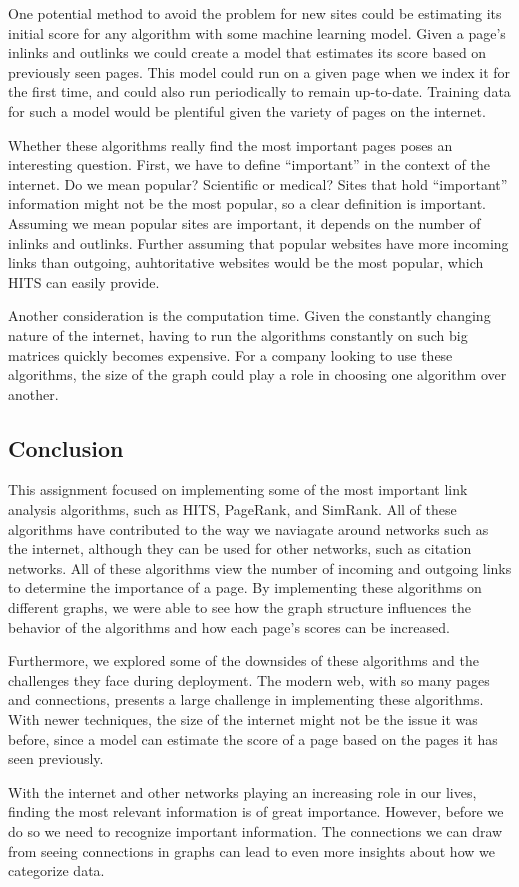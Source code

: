 \documentclass[
  paper=a4,
,captions=tableheading
]{scrartcl}
\begin{document}
One potential method to avoid the problem for new sites could be
estimating its initial score for any algorithm with some machine
learning model. Given a page's inlinks and outlinks we could create a
model that estimates its score based on previously seen pages. This
model could run on a given page when we index it for the first time, and
could also run periodically to remain up-to-date. Training data for such
a model would be plentiful given the variety of pages on the internet.

Whether these algorithms really find the most important pages poses an
interesting question. First, we have to define ``important'' in the
context of the internet. Do we mean popular? Scientific or medical?
Sites that hold ``important'' information might not be the most popular,
so a clear definition is important. Assuming we mean popular sites are
important, it depends on the number of inlinks and outlinks. Further
assuming that popular websites have more incoming links than outgoing,
auhtoritative websites would be the most popular, which HITS can easily
provide.

Another consideration is the computation time. Given the constantly
changing nature of the internet, having to run the algorithms constantly
on such big matrices quickly becomes expensive. For a company looking to
use these algorithms, the size of the graph could play a role in
choosing one algorithm over another.

\hypertarget{conclusion}{%
\subsection{Conclusion}\label{conclusion}}

This assignment focused on implementing some of the most important link
analysis algorithms, such as HITS, PageRank, and SimRank. All of these
algorithms have contributed to the way we naviagate around networks such
as the internet, although they can be used for other networks, such as
citation networks. All of these algorithms view the number of incoming
and outgoing links to determine the importance of a page. By
implementing these algorithms on different graphs, we were able to see
how the graph structure influences the behavior of the algorithms and
how each page's scores can be increased.

Furthermore, we explored some of the downsides of these algorithms and
the challenges they face during deployment. The modern web, with so many
pages and connections, presents a large challenge in implementing these
algorithms. With newer techniques, the size of the internet might not be
the issue it was before, since a model can estimate the score of a page
based on the pages it has seen previously.

With the internet and other networks playing an increasing role in our
lives, finding the most relevant information is of great importance.
However, before we do so we need to recognize important information. The
connections we can draw from seeing connections in graphs can lead to
even more insights about how we categorize data.
\end{document}
